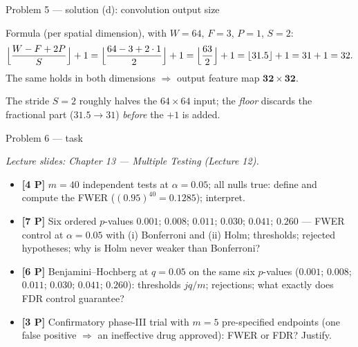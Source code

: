 \documentclass[aspectratio=169,11pt]{beamer}
\begin{document}
\begin{frame}{Problem 5 --- solution (d): convolution output size}
  \begin{solutionbox}
    Formula (per spatial dimension), with $W=64$, $F=3$, $P=1$, $S=2$:
    \[
      \Bigl\lfloor\frac{W-F+2P}{S}\Bigr\rfloor+1
      =\Bigl\lfloor\frac{64-3+2\cdot1}{2}\Bigr\rfloor+1
      =\Bigl\lfloor\frac{63}{2}\Bigr\rfloor+1
      =\lfloor31.5\rfloor+1=31+1=32.
    \]
    The same holds in both dimensions $\Rightarrow$ output feature map $\mathbf{32\times32}$.
    \medskip

    The stride $S=2$ roughly halves the $64\times64$ input; the \emph{floor} discards the
    fractional part ($31.5\to31$) \emph{before} the $+1$ is added.
  \end{solutionbox}
\end{frame}

\begin{frame}{Problem 6 --- task}
  \begin{exercise}
    {\scriptsize\itshape Lecture slides: Chapter 13 --- Multiple Testing (Lecture 12).}\par\smallskip
    \begin{itemize}
      \item[(a)] \textbf{[4 P]} $m=40$ independent tests at $\alpha=0.05$; all nulls true:
        define and compute the FWER ($(0.95)^{40}=0.1285$); interpret.
      \item[(b)] \textbf{[7 P]} Six ordered $p$-values
        $0.001$; $0.008$; $0.011$; $0.030$; $0.041$; $0.260$ --- FWER control at $\alpha=0.05$
        with (i) Bonferroni and (ii) Holm; thresholds; rejected hypotheses; why is Holm never
        weaker than Bonferroni?
      \item[(c)] \textbf{[6 P]} Benjamini--Hochberg at $q=0.05$ on the same six $p$-values
        ($0.001$; $0.008$; $0.011$; $0.030$; $0.041$; $0.260$): thresholds $jq/m$; rejections;
        what exactly does FDR control guarantee?
      \item[(d)] \textbf{[3 P]} Confirmatory phase-III trial with $m=5$ pre-specified endpoints
        (one false positive $\Rightarrow$ an ineffective drug approved): FWER or FDR? Justify.
    \end{itemize}
  \end{exercise}
\end{frame}
\end{document}
